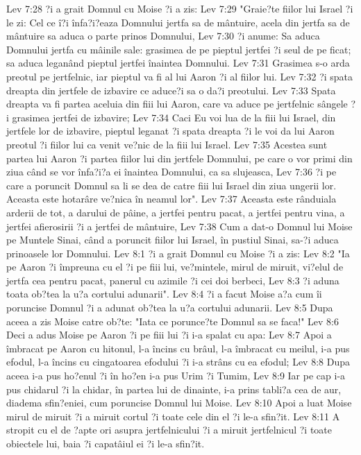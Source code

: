 Lev 7:28  ?i a grait Domnul cu Moise ?i a zis:
Lev 7:29  "Graie?te fiilor lui Israel ?i le zi: Cel ce î?i înfa?i?eaza Domnului jertfa sa de mântuire, acela din jertfa sa de mântuire sa aduca o parte prinos Domnului,
Lev 7:30  ?i anume: Sa aduca Domnului jertfa cu mâinile sale: grasimea de pe pieptul jertfei ?i seul de pe ficat; sa aduca leganând pieptul jertfei înaintea Domnului.
Lev 7:31  Grasimea s-o arda preotul pe jertfelnic, iar pieptul va fi al lui Aaron ?i al fiilor lui.
Lev 7:32  ?i spata dreapta din jertfele de izbavire ce aduce?i sa o da?i preotului.
Lev 7:33  Spata dreapta va fi partea aceluia din fiii lui Aaron, care va aduce pe jertfelnic sângele ?i grasimea jertfei de izbavire;
Lev 7:34  Caci Eu voi lua de la fiii lui Israel, din jertfele lor de izbavire, pieptul leganat ?i spata dreapta ?i le voi da lui Aaron preotul ?i fiilor lui ca venit ve?nic de la fiii lui Israel.
Lev 7:35  Acestea sunt partea lui Aaron ?i partea fiilor lui din jertfele Domnului, pe care o vor primi din ziua când se vor înfa?i?a ei înaintea Domnului, ca sa slujeasca,
Lev 7:36  ?i pe care a poruncit Domnul sa li se dea de catre fiii lui Israel din ziua ungerii lor. Aceasta este hotarâre ve?nica în neamul lor".
Lev 7:37  Aceasta este rânduiala arderii de tot, a darului de pâine, a jertfei pentru pacat, a jertfei pentru vina, a jertfei afierosirii ?i a jertfei de mântuire,
Lev 7:38  Cum a dat-o Domnul lui Moise pe Muntele Sinai, când a poruncit fiilor lui Israel, în pustiul Sinai, sa-?i aduca prinoasele lor Domnului.
Lev 8:1  ?i a grait Domnul cu Moise ?i a zis:
Lev 8:2  "Ia pe Aaron ?i împreuna cu el ?i pe fiii lui, ve?mintele, mirul de miruit, vi?elul de jertfa cea pentru pacat, panerul cu azimile ?i cei doi berbeci,
Lev 8:3  ?i aduna toata ob?tea la u?a cortului adunarii".
Lev 8:4  ?i a facut Moise a?a cum îi poruncise Domnul ?i a adunat ob?tea la u?a cortului adunarii.
Lev 8:5  Dupa aceea a zis Moise catre ob?te: "Iata ce porunce?te Domnul sa se faca!"
Lev 8:6  Deci a adus Moise pe Aaron ?i pe fiii lui ?i i-a spalat cu apa:
Lev 8:7  Apoi a îmbracat pe Aaron cu hitonul, l-a încins cu brâul, l-a îmbracat cu meilul, i-a pus efodul, l-a încins cu cingatoarea efodului ?i i-a strâns cu ea efodul;
Lev 8:8  Dupa aceea i-a pus ho?enul ?i în ho?en i-a pus Urim ?i Tumim,
Lev 8:9  Iar pe cap i-a pus chidarul ?i la chidar, în partea lui de dinainte, i-a prins tabli?a cea de aur, diadema sfin?eniei, cum poruncise Domnul lui Moise.
Lev 8:10  Apoi a luat Moise mirul de miruit ?i a miruit cortul ?i toate cele din el ?i le-a sfin?it.
Lev 8:11  A stropit cu el de ?apte ori asupra jertfelnicului ?i a miruit jertfelnicul ?i toate obiectele lui, baia ?i capatâiul ei ?i le-a sfin?it.
